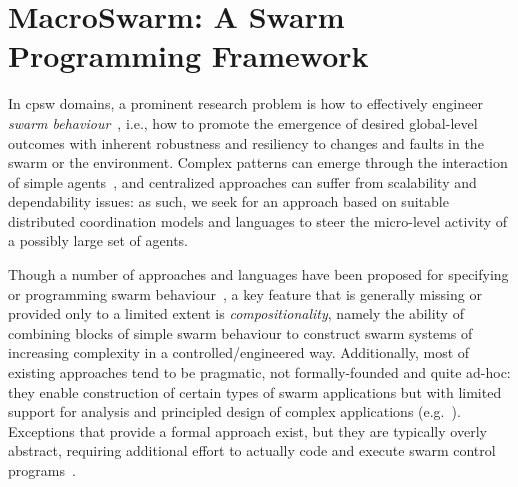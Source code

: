 %
\newcommand{\MacroSwarm}{{\sc{}MacroSwarm}}

\chapter[\MacroSwarm{}]{\MacroSwarm{}: A Swarm Programming Framework}
\minitoc%
%
In \ac{cpsw} domains,
 a prominent research problem
 is how to effectively engineer \emph{swarm behaviour}~\cite{DBLP:journals/swarm/BrambillaFBD13},
 i.e., how to promote 
 the emergence of desired global-level outcomes %
 with inherent robustness and resiliency to changes and faults in the swarm or the environment.
%
Complex patterns can emerge through the interaction of simple agents~\cite{bonabeau1999swarmintelligence-book}, and centralized approaches %
 can suffer from scalability and dependability issues: as such,  
 we seek for an approach based on %
 suitable distributed coordination models and languages to steer the micro-level activity of a possibly large set of agents.
%
 
%
Though a number of approaches and languages have been proposed 
 for specifying or programming swarm behaviour~\cite{Meld2007,%
DBLP:conf/icra/CarrollNS21,%
paros,%
DBLP:conf/isola/KosakHBWHR20,%
Koutsoubelias2016tecola,%
lima2018dolphin,%
Mottola2014voltron,%
DBLP:conf/iros/PinciroliB16,%
DBLP:conf/iros/YiDLD0WY20},
 a key feature that is generally missing or provided only to a limited extent
 is \emph{compositionality},
 namely the ability of combining blocks of simple swarm behaviour to construct swarm systems of increasing complexity in a controlled/engineered way.
%
Additionally, most of existing approaches tend to be pragmatic, not formally-founded and quite ad-hoc: they 
 enable construction of certain types of swarm applications
 but with limited support for analysis and principled design of complex applications (e.g.~\cite{lima2018dolphin,paros,DBLP:conf/iros/PinciroliB16,DBLP:conf/icra/CarrollNS21}).
%
Exceptions that provide a formal approach exist, but they are typically overly abstract, requiring additional effort to actually code and execute swarm control programs~\cite{DBLP:journals/csur/LuckcuckFDDF19}.


